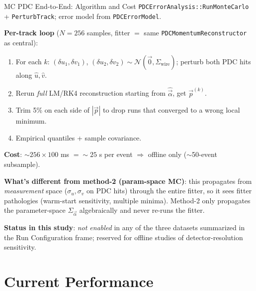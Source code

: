 \documentclass[aspectratio=169]{beamer}
\begin{document}
\begin{frame}{MC PDC End-to-End: Algorithm and Cost}
\small
\texttt{PDCErrorAnalysis::RunMonteCarlo} + \texttt{PerturbTrack}; error model from \texttt{PDCErrorModel}.

\textbf{Per-track loop} ($N = 256$ samples, fitter $=$ same \texttt{PDCMomentumReconstructor} as central):
\begin{enumerate}\setlength{\itemsep}{0pt}
\item For each $k$: $(\delta u_1, \delta v_1)$, $(\delta u_2, \delta v_2) \sim \mathcal{N}(\vec 0, \Sigma_\mathrm{wire})$; perturb both PDC hits along $\hat u, \hat v$.
\item Rerun \emph{full} LM/RK4 reconstruction starting from $\hat{\vec{\alpha}}$, get $\vec p^{(k)}$.
\item Trim 5\% on each side of $|\vec p|$ to drop runs that converged to a wrong local minimum.
\item Empirical quantiles + sample covariance.
\end{enumerate}

\textbf{Cost}: $\sim 256 \times 100$ ms $= \sim 25$ s per event $\Rightarrow$ offline only ($\sim$50-event subsample).

\vspace{0.1cm}
\textbf{What's different from method-2 (param-space MC)}: this propagates from \emph{measurement} space ($\sigma_u, \sigma_v$ on PDC hits) through the entire fitter, so it sees fitter pathologies (warm-start sensitivity, multiple minima). Method-2 only propagates the parameter-space $\Sigma_{\vec{\alpha}}$ algebraically and never re-runs the fitter.

\vspace{0.05cm}
\textbf{Status in this study}: \emph{not enabled} in any of the three datasets summarized in the Run Configuration frame; reserved for offline studies of detector-resolution sensitivity.
\end{frame}

\section{Current Performance}
\end{document}
